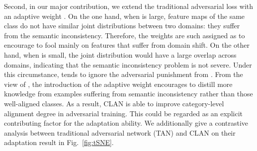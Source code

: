 \documentclass[10pt,twocolumn,letterpaper]{article}
\begin{document}
Second, in our major contribution, we extend the traditional adversarial loss with an adaptive weight . On the one hand, when  is large, feature maps of the same class do not have similar joint distributions between two domains: they suffer from the semantic inconsistency. Therefore, the weights are such assigned as to encourage  to fool  mainly on features that suffer from domain shift. On the other hand, when  is small, the joint distribution would have a large overlap across domains, indicating that the semantic inconsistency problem is not severe. Under this circumstance,  tends to ignore the adversarial punishment from . From the view of , the introduction of the adaptive weight encourages  to distill more knowledge from examples suffering from semantic inconsistency rather than those well-aligned classes. As a result, CLAN is able to improve category-level alignment degree in adversarial training. This could be regarded as an explicit contributing factor for the adaptation ability. We additionally give a contrastive analysis between traditional adversarial network (TAN) and CLAN on their adaptation result in Fig.~\ref{fig:tSNE}.
\end{document}
